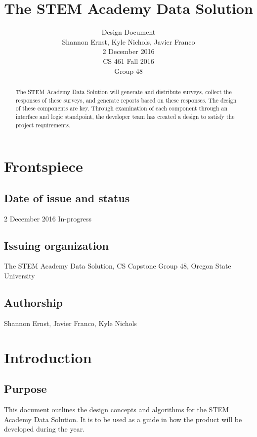 \documentclass[letterpaper,10pt,serif, draftclsnofoot,onecolumn, compsoc, titlepage]{IEEEtran}
\title{The STEM Academy Data Solution}
\author{Design Document \\ Shannon Ernst, Kyle Nichols, Javier Franco\\ 2 December 2016\\ CS 461 Fall 2016\\ Group 48}
\begin{document}
\maketitle
\begin{abstract}
The STEM Academy Data Solution will generate and distribute surveys, collect the responses of these surveys, and generate reports based on these responses. The design of these components are key. Through examination of each component through an interface and logic standpoint, the developer team has created a design to satisfy the project requirements. 
\end{abstract}

\newpage
\tableofcontents
\newpage

\section{Frontspiece}
\subsection{Date of issue and status}
2 December 2016 In-progress
\subsection{Issuing organization}
The STEM Academy Data Solution, CS Capstone Group 48, Oregon State University 
\subsection{Authorship}
Shannon Ernst, Javier Franco, Kyle Nichols

\section{Introduction}
\subsection{Purpose}
This document outlines the design concepts and algorithms for the STEM Academy Data Solution.
It is to be used as a guide in how the product will be developed during the year. 
\end{document}
